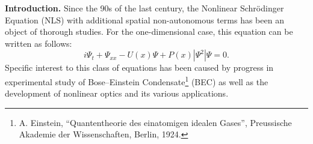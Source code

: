\documentclass[candidate, href, colorlinks]{disser}
\begin{document}
%	
%	
%
%
%
%
%
%


\textbf{Introduction.}
Since the 90s of the last century, the Nonlinear Schr\"odinger Equation (NLS) with additional spatial non-autonomous terms has been an object of thorough studies.
For the one-dimensional case, this equation can be written as follows:
\begin{equation}
	i \Psi_t + \Psi_{xx} - U(x) \Psi + P(x) |\Psi^2| \Psi = 0.
\label{eq:gpe}
\end{equation}
Specific interest to this class of equations has been caused by progress in experimental study of Bose--Einstein Condensate\footnote{A. Einstein, ``Quantentheorie des einatomigen idealen Gases'', Preussische Akademie der Wissenschaften, Berlin, 1924.} (BEC) as well as the development of nonlinear optics and its various applications.
\end{document}
